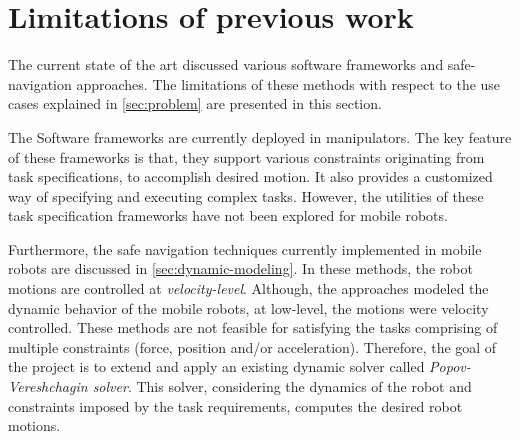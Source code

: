 \section{Limitations of previous work}
The current state of the art discussed various software frameworks and safe-navigation approaches. The limitations of these methods with respect to the use cases explained in \ref{sec:problem} are presented in this section. 

The Software frameworks are currently deployed in manipulators. The key feature of these frameworks is that, they support various constraints originating from task specifications, to accomplish desired motion. It also provides a customized way of specifying and executing complex tasks. However, the utilities of these task specification frameworks have not been explored for mobile robots. 

Furthermore, the safe navigation techniques currently implemented in mobile robots are discussed in \ref{sec:dynamic-modeling}. In these methods, the robot motions are controlled at \textit{velocity-level}. Although, the approaches modeled the dynamic behavior of the mobile robots, at low-level, the motions were velocity controlled. These methods are not feasible for satisfying the tasks comprising of multiple constraints (force, position and/or acceleration). Therefore, the goal of the project is to extend and apply an existing dynamic solver called \textit{Popov-Vereshchagin solver}. This solver, considering the dynamics of the robot and constraints imposed by the task requirements, computes the desired robot motions.






